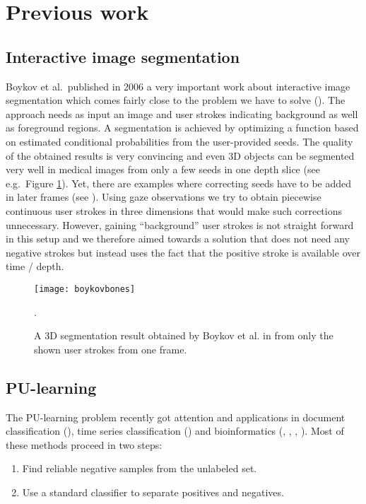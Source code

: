 \section{Previous work}
\subsection{Interactive image segmentation}
Boykov et al.\ published in 2006 a very important work about interactive image segmentation which comes fairly close to the problem we have to solve (\cite{boykov2006graph}). 
The approach needs as input an image and user strokes indicating background as well as foreground regions. 
A segmentation is achieved by optimizing a function based on estimated conditional probabilities from the user-provided seeds. 
The quality of the obtained results is very convincing and even 3D objects can be segmented very well in medical images from only a few seeds in one depth slice (see e.g.\ Figure \ref{fig:boykovbones}). 
Yet, there are examples where correcting seeds have to be added in later frames (see \cite[Section~Experimental Results]{boykov2006graph}). 
Using gaze observations we try to obtain piecewise continuous user strokes in three dimensions that would make such corrections unnecessary. However, gaining ``background'' user strokes is not straight forward in this setup and we therefore aimed towards a solution that does not need any negative strokes but instead uses the fact that the positive stroke is available over time / depth.

\begin{figure}[ht]
	\centering
	\texttt{[image: boykovbones]}
	\caption{A 3D segmentation result obtained by Boykov et al. in \cite{boykov2006graph} from only the shown user strokes from one frame.}.
	\label{fig:boykovbones}
\end{figure}

\subsection{PU-learning}
The PU-learning problem recently got attention and applications in document classification (\cite{li2003learning}), time series classification (\cite{nguyen2011positive}) and bioinformatics (\cite{elkan2008learning}, \cite{yang2012positive}, \cite{yang2014ensemble}, \cite{yousef2015novel}). 
Most of these methods proceed in two steps: 
\begin{enumerate}
 \item Find reliable negative samples from the unlabeled set.
 \item Use a standard classifier to separate positives and negatives.
\end{enumerate}

